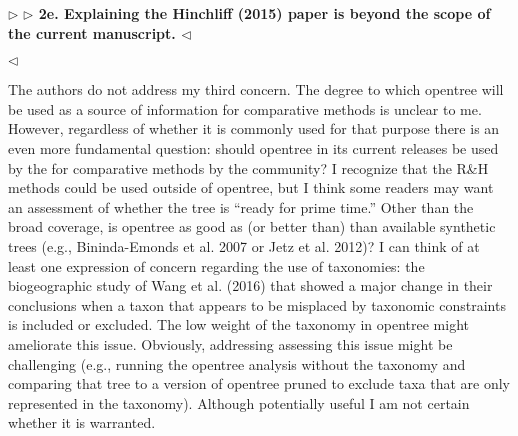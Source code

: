 \documentclass{article}
\newenvironment{reply}{$\triangleright$\bf}{$\triangleleft$}
\begin{document}
\begin{reply}
\begin{reply}
2e. Explaining the Hinchliff (2015) paper is beyond the scope of the current manuscript.
\end{reply}




\end{reply}

The authors do not address my third concern. The degree to which opentree will be used as a source of information for comparative methods is unclear to me. However, regardless of whether it is commonly used for that purpose there is an even more fundamental question: should opentree in its current releases be used by the for comparative methods by the community? I recognize that the R\&H methods could be used outside of opentree, but I think some readers may want an assessment of whether the tree is “ready for prime time.” Other than the broad coverage, is opentree as good as (or better than) than available synthetic trees (e.g., Bininda-Emonds et al. 2007 or Jetz et al. 2012)? I can think of at least one expression of concern regarding the use of taxonomies: the biogeographic study of Wang et al. (2016) that showed a major change in their conclusions when a taxon that appears to be misplaced by taxonomic constraints is included or excluded. The low weight of the taxonomy in opentree might ameliorate this issue. Obviously, addressing assessing this issue might be challenging (e.g., running the opentree analysis without the taxonomy and comparing that tree to a version of opentree pruned to exclude taxa that are only represented in the taxonomy). Although potentially useful I am not certain whether it is warranted.
\end{document}
